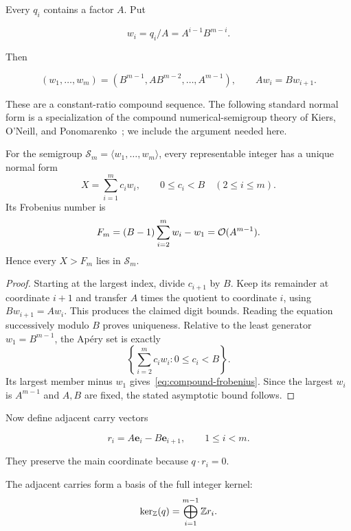 Every $q_i$ contains a factor $A$.  Put

\[
  w_i=q_i/A=A^{i-1}B^{m-i}.
\]

Then

\[
  (w_1,\ldots,w_m)
  =(B^{m-1},AB^{m-2},\ldots,A^{m-1}),
  \qquad Aw_i=Bw_{i+1}.
\]

These are a constant-ratio compound sequence.  The following standard normal
form is a specialization of the compound numerical-semigroup theory of
Kiers, O'Neill, and Ponomarenko~\cite[Proposition~12, Theorem~15,
Corollary~16]{kiers2016compound}; we include the argument needed here.

\begin{lemma}
  \label{lem:compound}
  For the semigroup $\mathcal S_m=\langle w_1,\ldots,w_m\rangle$, every
  representable integer has a unique normal form
  \[
    X=\sum_{i=1}^m c_iw_i,\qquad0\le c_i<B\quad(2\le i\le m).
  \]
  Its Frobenius number is
  \begin{equation}
    F_m=(B-1)\sum_{i=2}^m w_i-w_1=\mathcal{O}(A^{m-1}).
    \label{eq:compound-frobenius}
  \end{equation}
  Hence every $X>F_m$ lies in $\mathcal S_m$.
\end{lemma}

\begin{proof}
  Starting at the largest index, divide $c_{i+1}$ by $B$.  Keep its remainder
  at coordinate $i+1$ and transfer $A$ times the quotient to coordinate $i$,
  using $Bw_{i+1}=Aw_i$.  This produces the claimed digit bounds.  Reading the
  equation successively modulo $B$ proves uniqueness.  Relative to the least
  generator $w_1=B^{m-1}$, the Ap\'ery set is exactly
  \[
    \left\{\sum_{i=2}^m c_iw_i:0\le c_i<B\right\}.
  \]
  Its largest member minus $w_1$ gives~\eqref{eq:compound-frobenius}.  Since
  the largest $w_i$ is $A^{m-1}$ and $A,B$ are fixed, the stated asymptotic
  bound follows.
\end{proof}

Now define adjacent carry vectors

\begin{equation}
  r_i=A\mathbf e_i-B\mathbf e_{i+1},\qquad1\le i<m.
  \label{eq:carry-vector}
\end{equation}

They preserve the main coordinate because $q\cdot r_i=0$.

\begin{proposition}
  \label{prop:kernel}
  The adjacent carries form a basis of the full integer kernel:
  \begin{equation}
    \ker_{\mathbb{Z}}(q)
    =\bigoplus_{i=1}^{m-1}\mathbb{Z} r_i.
    \label{eq:full-kernel}
  \end{equation}
\end{proposition}

